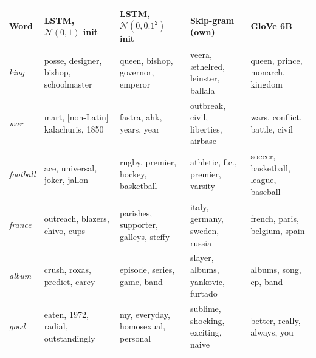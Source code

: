 \begin{tabularx}{\linewidth}{lXXXX}
\toprule
Word & LSTM, $\mathcal{N}(0,1)$ init & LSTM, $\mathcal{N}(0,0.1^2)$ init & Skip-gram (own) & GloVe 6B \\
\midrule
\textit{king} & posse, designer, bishop, schoolmaster & queen, bishop, governor, emperor & veera, æthelred, leinster, ballala & queen, prince, monarch, kingdom \\
\textit{war} & mart, [non-Latin] kalachuris, 1850 & fastra, ahk, years, year & outbreak, civil, liberties, airbase & wars, conflict, battle, civil \\
\textit{football} & ace, universal, joker, jallon & rugby, premier, hockey, basketball & athletic, f.c., premier, varsity & soccer, basketball, league, baseball \\
\textit{france} & outreach, blazers, chivo, cups & parishes, supporter, galleys, steffy & italy, germany, sweden, russia & french, paris, belgium, spain \\
\textit{album} & crush, roxas, predict, carey & episode, series, game, band & slayer, albums, yankovic, furtado & albums, song, ep, band \\
\textit{good} & eaten, 1972, radial, outstandingly & my, everyday, homosexual, personal & sublime, shocking, exciting, naive & better, really, always, you \\
\bottomrule
\end{tabularx}
